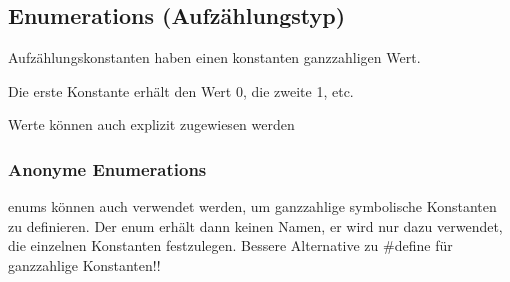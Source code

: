  	\subsection{Enumerations (Aufzählungstyp)}
 		\begin{minipage}[t]{9 cm}
	 		\vspace*{-0.5cm}
	 		
	 		\vspace*{0.5cm}
 		\end{minipage}
 		\hspace*{0.5 cm}
 		\begin{minipage}[t]{8 cm}
 			\begin{compactitem}
 				\item Aufzählungskonstanten haben einen konstanten ganzzahligen Wert.
 				\item Die erste Konstante erhält den Wert 0, die zweite 1, etc.
 				\item Werte können auch explizit zugewiesen werden
 			\end{compactitem}
 		\end{minipage}
 		\subsubsection{Anonyme Enumerations}
 			enums können auch verwendet werden, um ganzzahlige symbolische Konstanten zu definieren. Der enum erhält dann keinen Namen, er wird nur dazu verwendet, die einzelnen Konstanten festzulegen. Bessere Alternative zu \#define für ganzzahlige Konstanten!!
 			
 			\vspace*{0.5cm}